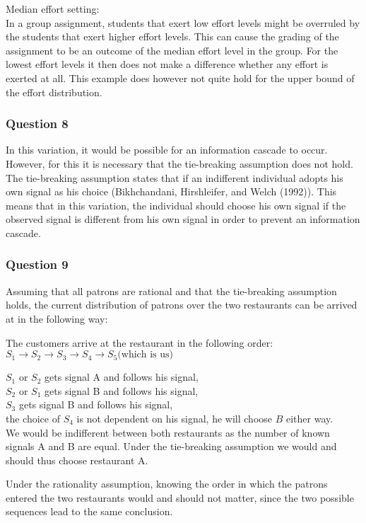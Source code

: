 \documentclass[a4paper]{article}
\begin{document}
\begin{enumerate}[(a)]
Median effort setting:\\
In a group assignment, students that exert low effort levels might be overruled by the students that exert higher effort levels. This can cause the grading of the assignment to be an outcome of the median effort level in the group. For the lowest effort levels it then does not make a difference whether any effort is exerted at all. This example does however not quite hold for the upper bound of the effort distribution.
\end{enumerate}
\subsubsection{Question 8}

In this variation, it would be possible for an information cascade to occur. However, for this it is necessary that the tie-breaking assumption does not hold. The tie-breaking assumption states that if an indifferent individual adopts his own signal as his choice (Bikhchandani, Hirshleifer, and Welch (1992)). This means that in this variation, the individual should choose his own signal if the observed signal is different from his own signal in order to prevent an information cascade.

\subsubsection{Question 9}

Assuming that all patrons are rational and that the tie-breaking assumption holds, the current distribution of patrons over the two restaurants can be arrived at in the following way:

The customers arrive at the restaurant in the following order:\\ $S_1\rightarrow S_2 \rightarrow S_3 \rightarrow S_4 \rightarrow S_5 \text{(which is us)}$

$S_1 \text{ or } S_2$ gets signal A and follows his signal,\\
$S_2 \text{ or } S_1$ gets signal B and follows his signal,\\
$S_3$ gets signal B and follows his signal,\\
the choice of $S_4$ is not dependent on his signal, he will choose $B$ either way.\\

We would be indifferent between both restaurants as the number of known signals A and B are equal. Under the tie-breaking assumption we would and should thus choose restaurant A.

Under the rationality assumption, knowing the order in which the patrons entered the two restaurants would and should not matter, since the two possible sequences lead to the same conclusion.
\end{document}
